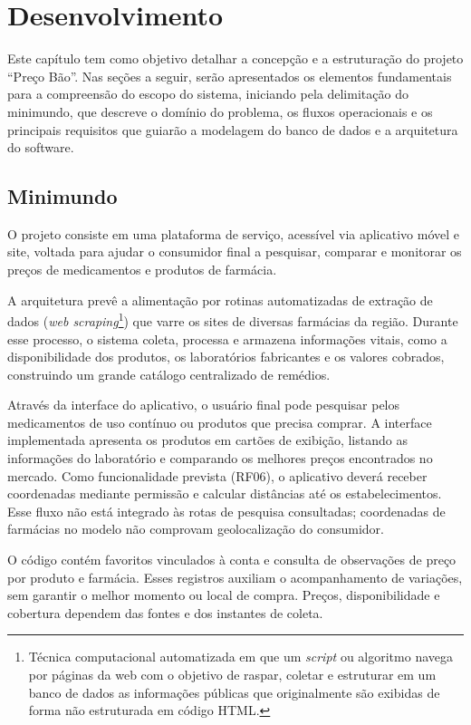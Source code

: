 \chapter{Desenvolvimento}\label{cap:desenvolvimento}

Este capítulo tem como objetivo detalhar a concepção e a estruturação do projeto ``Preço Bão''. Nas seções a seguir, serão apresentados os elementos fundamentais para a compreensão do escopo do sistema, iniciando pela delimitação do minimundo, que descreve o domínio do problema, os fluxos operacionais e os principais requisitos que guiarão a modelagem do banco de dados e a arquitetura do software.

\section{Minimundo}

O projeto consiste em uma plataforma de serviço, acessível via aplicativo móvel e site, voltada para ajudar o consumidor final a pesquisar, comparar e monitorar os preços de medicamentos e produtos de farmácia.

A arquitetura prevê a alimentação por rotinas automatizadas de extração de dados (\textit{web scraping}\footnote{Técnica computacional automatizada em que um \textit{script} ou algoritmo navega por páginas da web com o objetivo de raspar, coletar e estruturar em um banco de dados as informações públicas que originalmente são exibidas de forma não estruturada em código HTML.}) que varre os sites de diversas farmácias da região. Durante esse processo, o sistema coleta, processa e armazena informações vitais, como a disponibilidade dos produtos, os laboratórios fabricantes e os valores cobrados, construindo um grande catálogo centralizado de remédios.

Através da interface do aplicativo, o usuário final pode pesquisar pelos medicamentos de uso contínuo ou produtos que precisa comprar. A interface implementada apresenta os produtos em cartões de exibição, listando as informações do laboratório e comparando os melhores preços encontrados no mercado. Como funcionalidade prevista (RF06), o aplicativo deverá receber coordenadas mediante permissão e calcular distâncias até os estabelecimentos. Esse fluxo não está integrado às rotas de pesquisa consultadas; coordenadas de farmácias no modelo não comprovam geolocalização do consumidor.

O código contém favoritos vinculados à conta e consulta de observações de preço por produto e farmácia. Esses registros auxiliam o acompanhamento de variações, sem garantir o melhor momento ou local de compra. Preços, disponibilidade e cobertura dependem das fontes e dos instantes de coleta.

